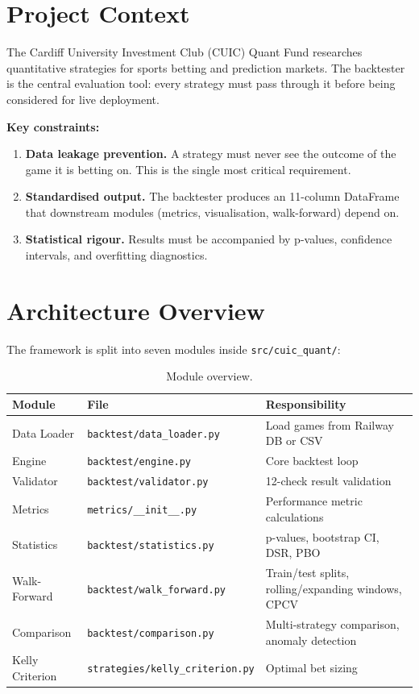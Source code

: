 \documentclass[12pt,a4paper]{report}
\theoremstyle{definition}
\newcommand{\file}[1]{\texttt{#1}}
\begin{document}
\section{Project Context}

The Cardiff University Investment Club (CUIC) Quant Fund researches quantitative strategies for sports betting and prediction markets. The backtester is the central evaluation tool: every strategy must pass through it before being considered for live deployment.

\textbf{Key constraints:}
\begin{enumerate}
    \item \textbf{Data leakage prevention.} A strategy must never see the outcome of the game it is betting on. This is the single most critical requirement.
    \item \textbf{Standardised output.} The backtester produces an 11-column DataFrame that downstream modules (metrics, visualisation, walk-forward) depend on.
    \item \textbf{Statistical rigour.} Results must be accompanied by p-values, confidence intervals, and overfitting diagnostics.
\end{enumerate}

\section{Architecture Overview}

The framework is split into seven modules inside \file{src/cuic\_quant/}:

\begin{table}[H]
\centering
\caption{Module overview.}
\label{tab:modules}
\begin{tabularx}{\textwidth}{llX}
\toprule
\textbf{Module} & \textbf{File} & \textbf{Responsibility} \\
\midrule
Data Loader     & \file{backtest/data\_loader.py}  & Load games from Railway DB or CSV \\
Engine          & \file{backtest/engine.py}         & Core backtest loop \\
Validator       & \file{backtest/validator.py}       & 12-check result validation \\
Metrics         & \file{metrics/\_\_init\_\_.py}     & Performance metric calculations \\
Statistics      & \file{backtest/statistics.py}      & p-values, bootstrap CI, DSR, PBO \\
Walk-Forward    & \file{backtest/walk\_forward.py}   & Train/test splits, rolling/expanding windows, CPCV \\
Comparison      & \file{backtest/comparison.py}      & Multi-strategy comparison, anomaly detection \\
Kelly Criterion & \file{strategies/kelly\_criterion.py} & Optimal bet sizing \\
\bottomrule
\end{tabularx}
\end{table}
\end{document}

